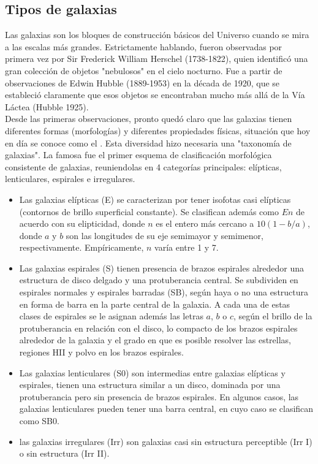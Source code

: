 
\subsection{Tipos de galaxias}



\citet{peebles2021extended}

\citet{bag2021shape}

Las galaxias son los bloques de construcci\'on b\'asicos del Universo cuando se mira a las escalas m\'as grandes.
Estrictamente hablando, fueron observadas por primera vez por Sir Frederick William Herschel (1738-1822),
quien identific\'o una gran colección de objetos "nebulosos" en el cielo nocturno. Fue a partir de observaciones de Edwin Hubble (1889-1953) en la d\'ecada de 1920, que se estableci\'o claramente que esos
objetos se encontraban mucho m\'as all\'a de la V\'ia L\'actea (Hubble 1925). \\

Desde las primeras observaciones, pronto qued\'o claro que las galaxias tienen diferentes formas (morfolog\'ias)
y diferentes propiedades f\'isicas, situación que hoy en d\'ia se conoce como el . Esta diversidad hizo necesaria una "taxonomía de galaxias". La famosa  fue el primer esquema de clasificaci\'on morfol\'ogica consistente de galaxias, reuniendolas en 4 categor\'ias principales: el\'ipticas, lenticulares, espirales e irregulares. \\ 

\begin{itemize}
\item Las galaxias el\'ipticas (E) se caracterizan por tener isofotas casi elípticas
(contornos de brillo superficial constante). Se clasifican adem\'as como $En$ de acuerdo con
su elipticidad, donde $n$ es el entero m\'as cercano a $10(1 -b/a)$, donde $a$ y $b$ son las longitudes de su eje semimayor y semimenor, respectivamente. Emp\'iricamente, $n$
var\'ia entre 1 y 7. 
\item Las galaxias espirales (S) tienen presencia de brazos espirales alrededor
una estructura de disco delgado y una protuberancia central. Se subdividen en espirales normales y
espirales barradas (SB), seg\'un haya o no una estructura en forma de barra en
la parte central de la galaxia. A cada una de estas clases de espirales se le asignan adem\'as las letras
$a$, $b$ o $c$, seg\'un el brillo de la protuberancia en relaci\'on con el disco, lo compacto de
los brazos espirales alrededor de la galaxia y el grado en que es posible resolver las estrellas,
regiones HII y polvo en los brazos espirales. 
\item Las galaxias lenticulares (S0) son intermedias entre galaxias el\'ipticas y espirales, tienen una estructura similar a un disco, dominada por una protuberancia pero sin presencia de brazos espirales. En algunos casos, las galaxias lenticulares pueden tener una barra central, en cuyo caso se clasifican como SB0. 
\item las galaxias irregulares (Irr) son galaxias casi sin estructura perceptible (Irr I) o sin estructura (Irr II).
\end{itemize}

